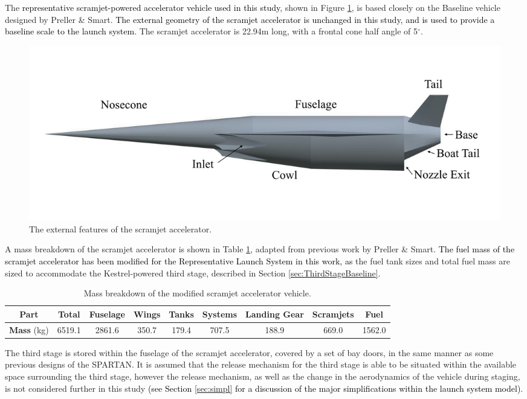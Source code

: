 		The \textcolor{black}{representative scramjet-powered accelerator vehicle used in this study}, shown in Figure \ref{fig:SPARTANlabelled}, is based closely on the Baseline vehicle designed by Preller \& Smart\cite{Preller2017b}. \textcolor{black}{The external geometry of the scramjet accelerator is unchanged in this study, and is used to provide a baseline scale to the launch system.} The scramjet accelerator is 22.94m long, with a frontal cone half angle of 5$^\circ$\cite{Preller2017b}. 
		\begin{figure}[ht]
			\centering
			\includegraphics[width=0.85\linewidth]{figures/3_vehicle_design/SPARTANlabelled}
			\caption{The external features of the scramjet accelerator.}
			\label{fig:SPARTANlabelled}
		\end{figure}
		A mass breakdown of the scramjet accelerator is shown in Table \ref{tab:MassBreakdown}, adapted from previous work by Preller \& Smart\cite{Preller2017b}. \textcolor{black}{The fuel mass of the scramjet accelerator has been modified for the Representative Launch System in this work, as} the fuel tank sizes and total fuel mass are sized to accommodate the Kestrel-powered third stage, described in Section \ref{sec:ThirdStageBaseline}.
		\begin{table}[h]
		\begin{tabular}{|c|c|c|c|c|c|c|c|c|}
			\hline  \textbf{Part} & Total & Fuselage & Wings & Tanks & Systems & Landing Gear & Scramjets & Fuel \\ 
			\hline \textbf{Mass} (kg) & 6519.1 & 2861.6 & 350.7 & 179.4 & 707.5 & 188.9 & 669.0 & 1562.0 \\ 
			\hline 
		\end{tabular} 
		\caption{Mass breakdown of the modified scramjet accelerator vehicle.}
		\label{tab:MassBreakdown}
		\end{table}
The third stage is stored within the fuselage of the scramjet accelerator, covered by a set of bay doors, in the same manner as some previous designs of the SPARTAN\cite{Jazra2013}. It is assumed that the release mechanism for the third stage is able to be situated within the available space surrounding the third stage, however the release mechanism, as well as the change in the aerodynamics of the vehicle during staging,  is not considered further in this study \textcolor{black}{(see Section \ref{sec:simpl} for a discussion of the major simplifications within the launch system model)}. %
		
